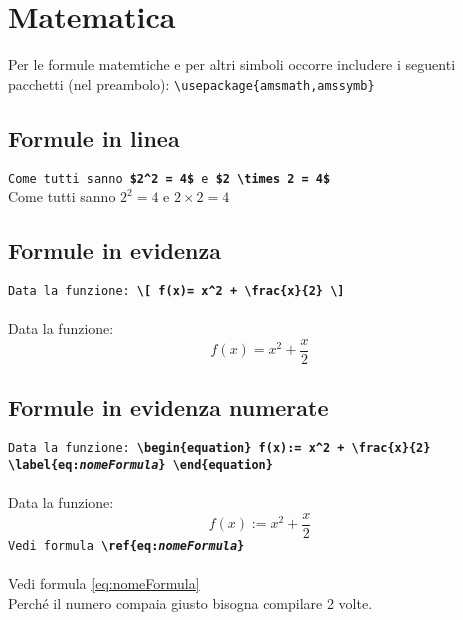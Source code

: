 \section{Matematica}
Per le formule matemtiche e per altri simboli occorre includere i seguenti pacchetti (nel preambolo):
\verb!\usepackage{amsmath,amssymb}!
\subsection{Formule in linea}
  \texttt{Come tutti sanno \textbf{\$2\^{}2 = 4\$} e \textbf{\$2 \textbackslash times 2 = 4\$}}\\
  Come tutti sanno $2^2 = 4$ e $2 \times 2= 4$
\subsection{Formule in evidenza}
  \texttt{Data la funzione: \textbf{\textbackslash[ f(x)= x\^{}2 + \textbackslash frac\{x\}\{2\} \textbackslash]}}\\~\\
  Data la funzione: \[ f(x)= x^2 + \frac{x}{2} \]
\subsection{Formule in evidenza numerate}
  \texttt{Data la funzione: \textbf{\textbackslash begin\{equation\} f(x):= x\^{}2 + \textbackslash frac\{x\}\{2\} \\ \textbackslash label\{eq:\emph{nomeFormula}\} \textbackslash end\{equation\}}}\\~\\
Data la funzione: \begin{equation} f(x):= x^2 + \frac{x}{2} \label{eq:nomeFormula}\end{equation}
  \texttt{Vedi formula \textbf{\textbackslash ref\{eq:\emph{nomeFormula}\}}}\\~\\
Vedi formula \ref{eq:nomeFormula}\\
Perché il numero compaia giusto bisogna compilare 2 volte.
